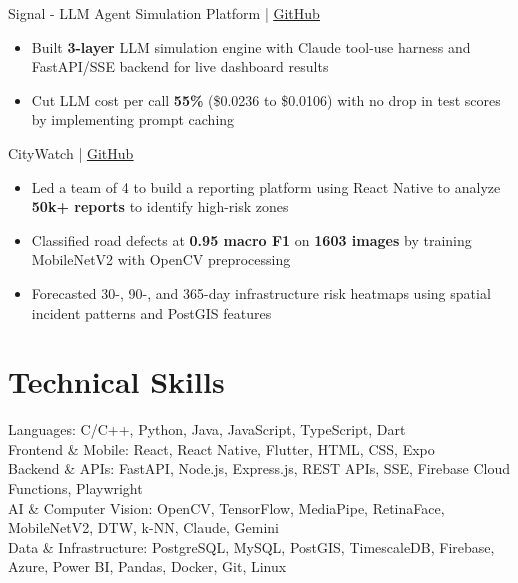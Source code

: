 \documentclass[11pt]{article}       %
\newcommand{\textsb}[1]{{\fontseries{sb}\selectfont #1}}
\begin{document}
\vspace{6pt}

\textsb{Signal - LLM Agent Simulation Platform} | \href{https://github.com/LegendaryArk/Signal}{\underline{GitHub}}
\begin{itemize}
    \item Built \textbf{3-layer} LLM simulation engine with Claude tool-use harness and FastAPI/SSE backend for live dashboard results
    \item Cut LLM cost per call \textbf{55\%} (\$0.0236 to \$0.0106) with no drop in test scores by implementing prompt caching
\end{itemize}

\vspace{6pt}

\textsb{CityWatch} | \href{https://github.com/LegendaryArk/CityWatch}{\underline{GitHub}}
\begin{itemize}
    \item Led a team of 4 to build a reporting platform using React Native to analyze \textbf{50k+ reports} to identify high-risk zones
    \item Classified road defects at \textbf{0.95 macro F1} on \textbf{1603 images} by training MobileNetV2 with OpenCV preprocessing
    \item Forecasted 30-, 90-, and 365-day infrastructure risk heatmaps using spatial incident patterns and PostGIS features
\end{itemize}


\section*{Technical Skills}
\textsb{Languages:} C/C++, Python, Java, JavaScript, TypeScript, Dart \\[-1pt]
\textsb{Frontend \& Mobile:} React, React Native, Flutter, HTML, CSS, Expo \\[-1pt]
\textsb{Backend \& APIs:} FastAPI, Node.js, Express.js, REST APIs, SSE, Firebase Cloud Functions, Playwright \\[-1pt]
\textsb{AI \& Computer Vision:} OpenCV, TensorFlow, MediaPipe, RetinaFace, MobileNetV2, DTW, k-NN, Claude, Gemini \\[-1pt]
\textsb{Data \& Infrastructure:} PostgreSQL, MySQL, PostGIS, TimescaleDB, Firebase, Azure, Power BI, Pandas, Docker, Git, Linux \\[-1pt]
\end{document}
